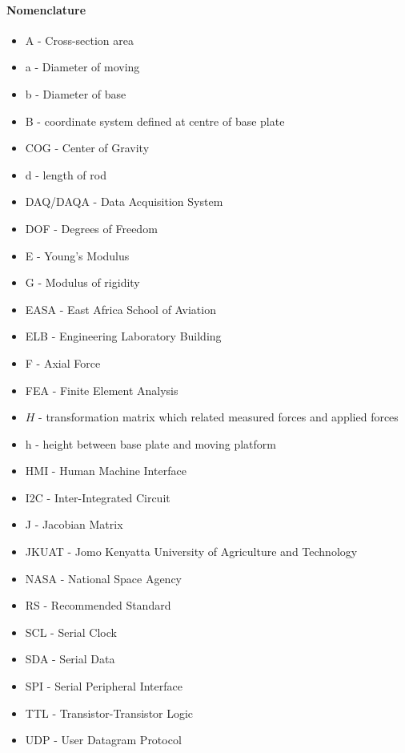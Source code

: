\paragraph{Nomenclature}
\begin{itemize}
\item A - Cross-section area
\item a - Diameter of moving 
\item b - Diameter of base
\item B - coordinate system defined at centre of base plate
\item COG - Center of Gravity
\item d - length of rod
\item DAQ/DAQA - Data Acquisition System
\item DOF - Degrees of Freedom
\item E - Young's Modulus
\item G - Modulus of rigidity
\item EASA - East Africa School of Aviation
\item ELB - Engineering Laboratory Building
\item F - Axial Force
\item FEA - Finite Element Analysis
\item $H$ - transformation matrix which related measured forces and applied forces
\item h - height between base plate and moving platform
\item HMI - Human Machine Interface 
\item I2C - Inter-Integrated Circuit 
\item J - Jacobian Matrix 
\item JKUAT - Jomo Kenyatta University of Agriculture and Technology
\item NASA - National Space Agency
\item RS - Recommended Standard
\item SCL - Serial Clock
\item SDA - Serial Data
\item SPI - Serial Peripheral Interface
\item TTL - Transistor-Transistor Logic
\item UDP - User Datagram Protocol
\end{itemize}
\pagebreak
